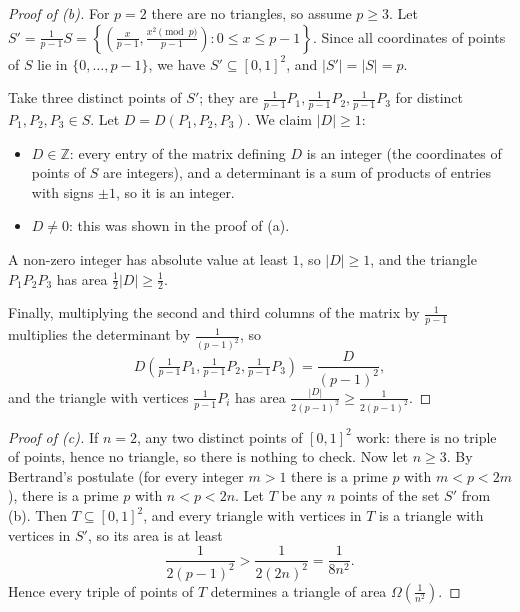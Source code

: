 \documentclass[a4paper,12pt]{article}
\newcommand{\card}[1]{\left| #1 \right|}
\newcommand{\mb}[1]{\mathbb{#1}}
\begin{document}
\begin{proof}[Proof of (b)]
	For $p = 2$ there are no triangles, so assume $p \ge 3$. Let $S' = \frac{1}{p-1} S = \left\{ \left( \frac{x}{p-1}, \frac{x^2 \pmod p}{p-1} \right) : 0 \le x \le p-1 \right\}$. Since all coordinates of points of $S$ lie in $\{0, \hdots, p-1\}$, we have $S' \subseteq [0,1]^2$, and $\card{S'} = \card{S} = p$.

	Take three distinct points of $S'$; they are $\frac{1}{p-1} P_1, \frac{1}{p-1} P_2, \frac{1}{p-1} P_3$ for distinct $P_1, P_2, P_3 \in S$. Let $D = D(P_1, P_2, P_3)$. We claim $\card{D} \ge 1$:
	\begin{itemize}
		\item $D \in \mb Z$: every entry of the matrix defining $D$ is an integer (the coordinates of points of $S$ are integers), and a determinant is a sum of products of entries with signs $\pm 1$, so it is an integer.
		\item $D \neq 0$: this was shown in the proof of (a).
	\end{itemize}
	A non-zero integer has absolute value at least $1$, so $\card{D} \ge 1$, and the triangle $P_1 P_2 P_3$ has area $\frac12 \card{D} \ge \frac12$.

	Finally, multiplying the second and third columns of the matrix by $\frac{1}{p-1}$ multiplies the determinant by $\frac{1}{(p-1)^2}$, so
	\[
		D\left( \tfrac{1}{p-1} P_1, \tfrac{1}{p-1} P_2, \tfrac{1}{p-1} P_3 \right) = \frac{D}{(p-1)^2},
	\]
	and the triangle with vertices $\frac{1}{p-1} P_i$ has area $\frac{\card{D}}{2(p-1)^2} \ge \frac{1}{2(p-1)^2}$.
\end{proof}

\begin{proof}[Proof of (c)]
	If $n = 2$, any two distinct points of $[0,1]^2$ work: there is no triple of points, hence no triangle, so there is nothing to check. Now let $n \ge 3$. By Bertrand's postulate (for every integer $m > 1$ there is a prime $p$ with $m < p < 2m$), there is a prime $p$ with $n < p < 2n$. Let $T$ be any $n$ points of the set $S'$ from (b). Then $T \subseteq [0,1]^2$, and every triangle with vertices in $T$ is a triangle with vertices in $S'$, so its area is at least
	\[
		\frac{1}{2(p-1)^2} > \frac{1}{2(2n)^2} = \frac{1}{8n^2}.
	\]
	Hence every triple of points of $T$ determines a triangle of area $\Omega\left( \frac{1}{n^2} \right)$.
\end{proof}


\end{document}

